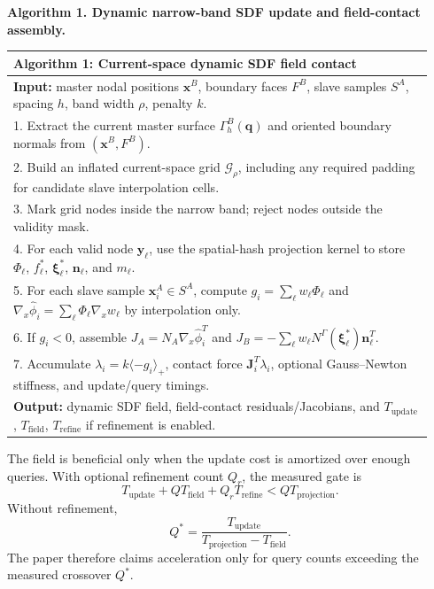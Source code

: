 \documentclass[11pt]{article}
\begin{document}
\begin{center}
\small
\textbf{Algorithm 1. Dynamic narrow-band SDF update and field-contact assembly.}
\vspace{0.4em}

\renewcommand{\arraystretch}{1.08}
\begin{tabular}{p{0.94\linewidth}}
\toprule
\textbf{Algorithm 1: Current-space dynamic SDF field contact} \\
\midrule
\textbf{Input:} master nodal positions \(\mathbf{x}^B\), boundary faces \(F^B\), slave samples \(S^A\), spacing \(h\), band width \(\rho\), penalty \(k\). \\
1. Extract the current master surface \(\Gamma_h^B(\mathbf{q})\) and oriented boundary normals from \((\mathbf{x}^B,F^B)\). \\
2. Build an inflated current-space grid \(\mathcal{G}_\rho\), including any required padding for candidate slave interpolation cells. \\
3. Mark grid nodes inside the narrow band; reject nodes outside the validity mask. \\
4. For each valid node \(\mathbf{y}_\ell\), use the spatial-hash projection kernel to store \(\Phi_\ell\), \(f_\ell^\ast\), \(\boldsymbol{\xi}_\ell^\ast\), \(\mathbf{n}_\ell\), and \(m_\ell\). \\
5. For each slave sample \(\mathbf{x}_i^A\in S^A\), compute \(g_i=\sum_\ell w_\ell\Phi_\ell\) and \(\nabla_x\hat{\phi}_i=\sum_\ell\Phi_\ell\nabla_x w_\ell\) by interpolation only. \\
6. If \(g_i<0\), assemble \(J_A=N_A\nabla_x\hat{\phi}_i^T\) and \(J_B=-\sum_\ell w_\ell N^\Gamma(\boldsymbol{\xi}_\ell^\ast)\mathbf{n}_\ell^T\). \\
7. Accumulate \(\lambda_i=k\langle -g_i\rangle_+\), contact force \(\mathbf{J}_i^T\lambda_i\), optional Gauss--Newton stiffness, and update/query timings. \\
\textbf{Output:} dynamic SDF field, field-contact residuals/Jacobians, and \(T_\mathrm{update}\), \(T_\mathrm{field}\), \(T_\mathrm{refine}\) if refinement is enabled. \\
\bottomrule
\end{tabular}
\end{center}

The field is beneficial only when the update cost is amortized over enough queries. With optional refinement count \(Q_r\), the measured gate is
\begin{equation}
T_\mathrm{update}
+
Q T_\mathrm{field}
+
Q_r T_\mathrm{refine}
<
Q T_\mathrm{projection}.
\end{equation}
Without refinement,
\begin{equation}
Q^\ast =
\frac{T_\mathrm{update}}
{T_\mathrm{projection}-T_\mathrm{field}} .
\end{equation}
The paper therefore claims acceleration only for query counts exceeding the measured crossover \(Q^\ast\).
\end{document}
